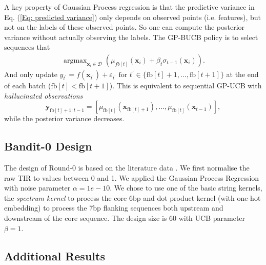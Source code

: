 A key property of Gaussian Process regression is that the predictive variance in Eq. (\ref{Eq: predicted variance}) only depends on observed points (i.e. features), but not on the labels of these observed points. 
So one can compute the posterior variance without actually observing the labels. 
The GP-BUCB policy is to select sequences that
\begin{align}
    \operatorname{argmax}_{\mathbf{x}_i \in \mathcal{D}} \left( \mu_{fb[t]}(\mathbf{x}_i) + \beta_t \sigma_{t-1}(\mathbf{x}_i)\right).
\end{align}
And only update $y_{t^{\prime}}=f\left(\boldsymbol{x}_{t^{\prime}}\right)+\varepsilon_{t^{\prime}} \text { for } t^{\prime} \in\{\mathrm{fb}[t]+1, \ldots, \mathrm{fb}[t+1]\}$ at the end of each batch ($\mathrm{fb}[t]<\mathrm{fb}[t+1]$). 
This is equivalent to sequential GP-UCB with \textit{hallucinated observations} $$\boldsymbol{y}_{\mathrm{fb}[t]+1: t-1}=\left[\mu_{\mathrm{fb}[t]}\left(\boldsymbol{x}_{\mathrm{fb}[t]+1}\right), \ldots, \mu_{\mathrm{fb}[t]}\left(\boldsymbol{x}_{t-1}\right)\right],$$
while the posterior variance decreases. 

\subsection{Bandit-0 Design}
\label{sec: ML design pipeline}

The design of Round-0 is based on the literature data \cite{jervis2018machine}.
We first normalise the raw TIR to values between 0 and 1. 
We applied the Gaussian Process Regression with noise parameter $\alpha = 1e-10$. 
We chose to use one of the basic string kernels, the \textit{spectrum kernel} \cite{leslie2001spectrum} to process the core 6bp and dot product kernel \cite{Rasmussen2004} (with one-hot embedding) to process the 7bp flanking sequences both upstream and downstream of the core sequence.
The design size is 60 with UCB parameter $\beta = 1$.

\subsection{Additional Results}

